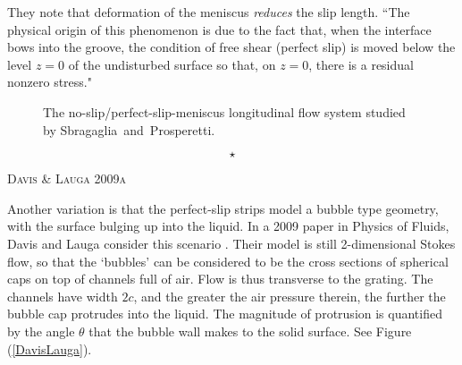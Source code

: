 \documentclass[12pt, a4paper, twoside, openright]{book}
\newcommand{\sep}{\begin{equation*} \star \end{equation*}}
\newcommand{\paper}[1]
         {\colorbox[gray]{0.8}{ \textsc{#1}}
         
         }
\begin{document}
They note that deformation of the meniscus \emph{reduces} the slip length. ``The physical origin of this phenomenon is due to the fact that, when the interface bows into the groove, the condition of free shear (perfect slip) is moved below the level $z=0$ of the undisturbed surface so that, on $z=0$, there is a residual nonzero stress."

\begin{figure}[ht]
\centering
{}
\caption{The no-slip/perfect-slip-meniscus longitudinal flow system \mbox{studied} by Sbragaglia~and~Prosperetti.} \label{SbragProsp}
\end{figure}

\sep


\paper{Davis \& Lauga 2009a}
Another variation is that the perfect-slip strips model a bubble type geometry, with the surface bulging up into the liquid.  In a 2009 paper in Physics of Fluids, Davis and Lauga consider this scenario \cite{DavisLauga2009a}.  Their model is still 2-dimensional Stokes flow, so that the `bubbles' can be considered to be the cross sections of spherical caps on top of channels full of air. Flow is thus transverse to the grating.  The channels have width $2c$, and the greater the air pressure therein, the further the bubble cap protrudes into the liquid.  The magnitude of protrusion is quantified by the angle $\theta$ that the bubble wall makes to the solid surface.
See Figure (\ref{DavisLauga}).
\end{document}
